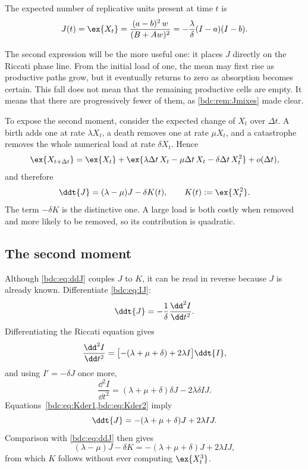 \begin{theorem}
\label{bdc:thm:J}
The expected number of replicative units present at time $t$ is
\begin{equation}
\label{bdc:eq:J}
J(t)=\ex{X_t}
=\frac{(a-b)^2\,w}{(B+Aw)^2}
=-\frac{\lambda}{\delta}(I-a)(I-b).
\end{equation}
\end{theorem}

The second expression will be the more useful one: it places $J$ directly on
the Riccati phase line. From the initial load of one, the mean may first rise as
productive paths grow, but it eventually returns to zero as absorption becomes
certain. This fall does not mean that the remaining productive cells are
empty. It means that there are progressively fewer of them, as
\cref{bdc:rem:Jmixes} made clear.

To expose the second moment, consider the expected change of $X_t$ over
$\Delta t$. A birth adds one at rate $\lambda X_t$, a death removes one at rate
$\mu X_t$, and a catastrophe removes the whole numerical load at rate
$\delta X_t$. Hence
\[
\ex{X_{t+\Delta t}}
=\ex{X_t}
+\ex{\lambda\Delta t\,X_t-\mu\Delta t\,X_t
-\delta\Delta t\,X_t^2}
+o(\Delta t),
\]
and therefore
\begin{equation}
\label{bdc:eq:ddJ}
\ddt{J}=(\lambda-\mu)J-\delta K(t),
\qquad K(t):=\ex{X_t^2}.
\end{equation}
The term $-\delta K$ is the distinctive one. A large load is both costly when
removed and more likely to be removed, so its contribution is quadratic.

\subsection{The second moment}
\label{bdc:sec:K}

Although \cref{bdc:eq:ddJ} couples $J$ to $K$, it can be read in reverse because
$J$ is already known. Differentiate \cref{bdc:eq:IJ}:
\begin{equation}
\label{bdc:eq:Kder1}
\ddt{J}=-\frac{1}{\delta}\frac{\dd^2I}{\dd t^2}.
\end{equation}
Differentiating the Riccati equation gives
\[
\frac{\dd^2I}{\dd t^2}
=\bigl[-(\lambda+\mu+\delta)+2\lambda I\bigr]\ddt{I},
\]
and using $I'=-\delta J$ once more,
\begin{equation}
\label{bdc:eq:Kder2}
\frac{\dd^2I}{\dd t^2}
=(\lambda+\mu+\delta)\delta J-2\lambda\delta I J.
\end{equation}
Equations~\cref{bdc:eq:Kder1,bdc:eq:Kder2} imply
\[
\ddt{J}=-(\lambda+\mu+\delta)J+2\lambda I J.
\]
Comparison with \cref{bdc:eq:ddJ} then gives
\[
(\lambda-\mu)J-\delta K
=-(\lambda+\mu+\delta)J+2\lambda I J,
\]
from which $K$ follows without ever computing $\ex{X_t^3}$.

